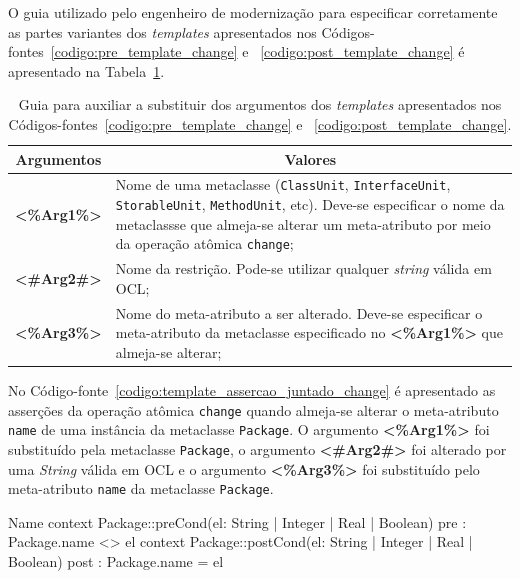 O guia utilizado pelo engenheiro de modernização para especificar corretamente as partes variantes dos \textit{templates} apresentados nos Códigos-fontes~\ref{codigo:pre_template_change} e ~\ref{codigo:post_template_change} é apresentado na Tabela~\ref{tab:guia_template_pre_pos_change}.

\begin{table}[h]
\centering
\caption{Guia para auxiliar a substituir dos argumentos dos \textit{templates} apresentados nos Códigos-fontes~\ref{codigo:pre_template_change} e ~\ref{codigo:post_template_change}.}
\label{tab:guia_template_pre_pos_change}
\begin{tabular}{ | m{1.7cm} | m{12cm}| } 
\hline
\multicolumn{1}{|c|}{Argumentos}                                         & \multicolumn{1}{c|}{Valores} \\ \hline
\multicolumn{1}{|c|}{\textbf{<\%Arg1\%>}} & Nome de uma metaclasse (\texttt{ClassUnit}, \texttt{InterfaceUnit}, \texttt{StorableUnit}, \texttt{MethodUnit}, etc). Deve-se especificar o nome da metaclassse que almeja-se alterar um meta-atributo por meio da operação atômica \texttt{change}; \\ 
\hline
\multicolumn{1}{|c|}{\textbf{<\#Arg2\#>}} & Nome da restrição. Pode-se utilizar qualquer \textit{string} válida em OCL; \\ 
\hline
\multicolumn{1}{|c|}{\textbf{<\%Arg3\%>}} & Nome do meta-atributo a ser alterado. Deve-se especificar o meta-atributo da metaclasse especificado no \textbf{<\%Arg1\%>} que almeja-se alterar; \\ 
\hline
\end{tabular}
\end{table}

No Código-fonte~\ref{codigo:template_assercao_juntado_change} é apresentado as asserções da operação atômica \texttt{change} quando almeja-se alterar o meta-atributo \texttt{name} de uma instância da metaclasse \texttt{Package}. O argumento \textbf{<\%Arg1\%>} foi substituído pela metaclasse \texttt{Package}, o argumento \textbf{<\#Arg2\#>} foi alterado por uma \textit{String} válida em OCL e o argumento \textbf{<\%Arg3\%>} foi substituído pelo meta-atributo \texttt{name} da metaclasse \texttt{Package}.

\begin{codigo}[caption={[Asserções em OCL para realizar a operação atômica \texttt{change}.] Asserções em OCL para realizar a operação atômica \texttt{change}.},escapeinside={(*@}{@*)}, mathescape=true, basicstyle=\footnotesize, label={codigo:template_assercao_juntado_change}, language=OCL]{Name}
context Package::preCond(el: String | Integer | Real | Boolean)
pre : Package.name <> el
context Package::postCond(el: String | Integer | Real | Boolean)
post : Package.name = el
\end{codigo}


